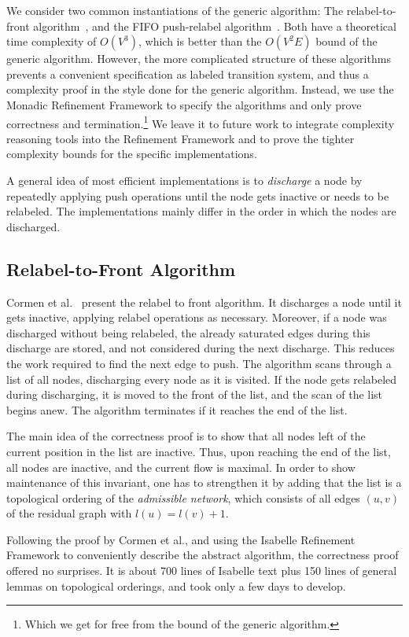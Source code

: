 \documentclass[smallcondensed]{svjour3}     %
\begin{document}
We consider two common instantiations of the generic algorithm: The relabel-to-front algorithm~\cite{CLRS09}, and the FIFO push-relabel algorithm~\cite{GoTa88}.
Both have a theoretical time complexity of $O(V^3)$, which is better than the $O(V^2E)$ bound of the generic algorithm.
However, the more complicated structure of these algorithms prevents a convenient specification as labeled transition system, and thus 
a complexity proof in the style done for the generic algorithm.
Instead, we use the Monadic Refinement Framework to specify the algorithms and only prove correctness and 
termination.\footnote{Which we get for free from the bound of the generic algorithm.} We leave it to future work to integrate complexity reasoning tools into 
the Refinement Framework and to prove the tighter complexity bounds for the specific implementations.

A general idea of most efficient implementations is to \emph{discharge} a node by repeatedly applying push operations until the node gets inactive or needs to be relabeled.
The implementations mainly differ in the order in which the nodes are discharged.

\subsection{Relabel-to-Front Algorithm}
Cormen et al.~\cite{CLRS09} present the relabel to front algorithm.
It discharges a node until it gets inactive, applying relabel operations as necessary. 
Moreover, if a node was discharged without being relabeled, the already saturated edges during this discharge are stored, and not considered 
during the next discharge. This reduces the work required to find the next edge to push.
The algorithm scans through a list of all nodes, discharging every node as it is visited.
If the node gets relabeled during discharging, it is moved to the front of the list, and the scan of the list begins anew.
The algorithm terminates if it reaches the end of the list. 

The main idea of the correctness proof is to show that all nodes left of 
the current position in the list are inactive. Thus, upon reaching the end of the list, all nodes are inactive, and the current flow is maximal.
In order to show maintenance of this invariant, one has to strengthen it by adding that the list is a topological ordering of the 
\emph{admissible network}, which consists of all edges $(u,v)$ of the residual graph with $l(u) = l(v) + 1$. 

Following the proof by Cormen et al., and using the Isabelle Refinement Framework to conveniently describe the abstract algorithm,
the correctness proof offered no surprises. It is about 700 lines of Isabelle text plus 150 lines of general lemmas on topological orderings, 
and took only a few days to develop.
\end{document}

